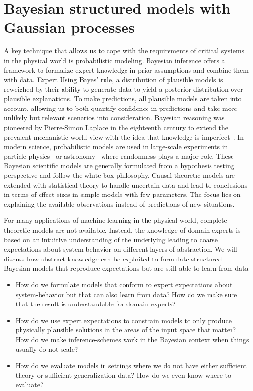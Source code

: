 \section{Bayesian structured models with Gaussian processes}
A key technique that allows us to cope with the requirements of critical systems in the physical world is probabilistic modeling.
Bayesian inference offers a framework to formalize expert knowledge in prior assumptions and combine them with data.
Expert
Using Bayes' rule, a distribution of plausible models is reweighed by their ability to generate data to yield a posterior distribution over plausible explanations.
To make predictions, all plausible models are taken into account, allowing us to both quantify confidence in predictions and take more unlikely but relevant scenarios into consideration.
Bayesian reasoning was pioneered by Pierre-Simon Laplace in the eighteenth century to extend the prevalent mechanistic world-view with the idea that knowledge is imperfect~\parencite{pulskamp_laplace_2020}.
In modern science, probabilistic models are used in large-scale experiments in particle physics~\parencite{khachatryan_observation_2015} or astronomy~\parencite{collaboration_first_2019,the_ligo_scientific_collaboration_observation_2016} where randomness plays a major role.
These Bayesian scientific models are generally formulated from a hypothesis testing perspective and follow the white-box philosophy.
Causal theoretic models are extended with statistical theory to handle uncertain data and lead to conclusions in terms of effect sizes in simple models with few parameters.
The focus lies on explaining the available observations instead of predictions of new situations.

For many applications of machine learning in the physical world, complete theoretic models are not available.
Instead, the knowledge of domain experts is based on an intuitive understanding of the underlying leading to coarse expectations about system-behavior on different layers of abstraction.
We will discuss how abstract knowledge can be exploited to formulate structured Bayesian models that reproduce expectations but are still able to learn from data

\begin{itemize}
    \item How do we formulate models that conform to expert expectations about system-behavior but that can also learn from data? How do we make sure that the result is understandable for domain experts?
    \item How do we use expert expectations to constrain models to only produce physically plausible solutions in the areas of the input space that matter? How do we make inference-schemes work in the Bayesian context when things usually do not scale?
    \item How do we evaluate models in settings where we do not have either sufficient theory or sufficient generalization data? How do we even know where to evaluate?
\end{itemize}

